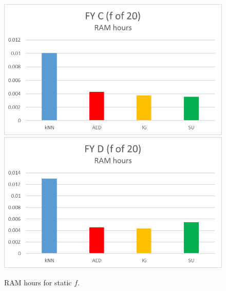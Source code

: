 \begin{figure}[hp]
\includegraphics[scale=0.17]{Graphs/FY_C/mem20}
\includegraphics[scale=0.17]{Graphs/FY_D/mem20}
\caption{RAM hours for static $f$.}
\label{fig:mem}
\end{figure}

